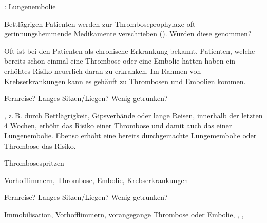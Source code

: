 {{\TxSAMPLER}: Lungenembolie}
{
\begin{SAMPLERText}
  \item[\SAMPLER{M}] Bettlägrigen Patienten werden zur
  Thromboseprophylaxe oft gerinnungshemmende Medikamente
  verschrieben (). Wurden diese
  genommen?
  \item[\SAMPLER{P}]
  Oft ist bei den Patienten  als
  chronische Erkrankung bekannt. Patienten, welche bereits
  schon einmal eine Thrombose oder eine Embolie hatten
  haben ein erhöhtes Risiko neuerlich daran zu erkranken. Im
  Rahmen von Krebserkrankungen kann es gehäuft zu Thrombosen
  und Embolien kommen.
  \item[\SAMPLER{E}] Fernreise? Langes Sitzen/Liegen? Wenig
  getrunken?
  \item[\SAMPLER{R}] , z.\,B. durch Bettlägrigkeit,
  Gipsverbände oder lange Reisen, innerhalb der letzten 4
  Wochen, erhöht das Risiko einer Thrombose und damit auch das
  einer Lungenembolie. Ebenso erhöht eine bereits durchgemachte 
  Lungemembolie oder Thrombose das Risiko. 
\end{SAMPLERText}
}
{
\begin{SAMPLERSlide}
  \item[\SAMPLER{M}] Thrombosespritzen
  \item[\SAMPLER{P}] Vorhofflimmern, Thrombose, Embolie,
  Krebserkrankungen
  \item[\SAMPLER{E}] Fernreise? Langes Sitzen/Liegen? Wenig
  getrunken?
  \item[\SAMPLER{R}] Immobilisation, Vorhofflimmern, vorangegange Thrombose oder Embolie, 
  , , 
\end{SAMPLERSlide}
}
{}
{}
{}









